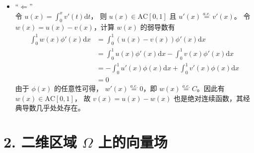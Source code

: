 \documentclass[a4paper]{article}
\begin{document}
\begin{enumerate}
\begin{itemize}
\begin{equation}
\begin{aligned}
                                \left[
                                    \int_{0}^{t} (v'(s))^2 \text{d}s
                                    \cdot \int_{0}^{t} 1^2 \text{d}s
                                \right]
                                \text{d}t\right)^{\frac{1}{2}}
                                + |v(0)|\\
                            &\leq \left(\int_{0}^{1}
                                C_0t \  
                                \text{d}t\right)^{\frac{1}{2}}
                                + |v(0)|\\
                            &\leq \sqrt{\frac{C_0}{2}}
                                + |v(0)| < \infty
                        \end{aligned}
                    \end{equation}
                    另一方面，经典导数 $v'(x)$ 自然满足弱导数定义。
                \item “$\Leftarrow$”\\
                    令 $u(x) = \int_{0}^{x}v'(t)\text{d}t$，
                    则 $u(x)\in \text{AC}[0,1]$ 且 $u'(x) \overset{a.e.}{=} v'(x)$。
                    令 $w(x)=u(x)-v(x)$，计算 $w(x)$ 的弱导数有
                    \begin{equation}
                        \begin{aligned}
                            \int_{0}^{1} w(x) \phi'(x) \text{d}x
                            &= \int_{0}^{1} (u(x)-v(x)) \phi'(x) \text{d}x\\
                            &= \int_{0}^{1} u(x) \phi'(x) \text{d}x - \int_{0}^{1} v(x) \phi'(x) \text{d}x\\    
                            &= -\int_{0}^{1} u'(x) \phi(x) \text{d}x + \int_{0}^{1} v'(x) \phi(x) \text{d}x\\
                            &= 0
                        \end{aligned}
                    \end{equation}
                    由于 $\phi(x)$ 的任意性可得， $w'(x)\overset{a.e.}{=} 0$，即
                    $w(x) \overset{a.e.}{=} C$。因此有 $w(x)\in \text{AC}[0,1]$，
                    故 $v(x) = u(x) - w(x)$ 也是绝对连续函数，其经典导数几乎处处存在。
            \end{itemize}
\end{enumerate}

\section*{2. 二维区域 $\Omega$ 上的向量场}
\end{document}
